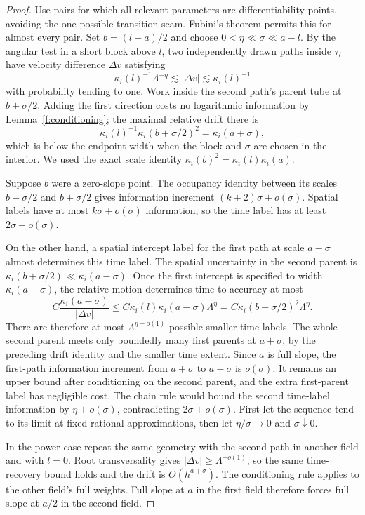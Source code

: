 \begin{proof}
Use pairs for which all relevant parameters are differentiability
points, avoiding the one possible transition seam. Fubini's theorem
permits this for almost every pair. Set $b=(l+a)/2$ and choose
$0<\eta\ll\sigma\ll a-l$. By the angular test in a short block
above $l$, two independently drawn paths inside $\tau_l$ have
velocity difference $\Delta v$ satisfying
\[
 \kappa_i(l)^{-1}\Lambda^{-\eta}
 \lesssim|\Delta v|\lesssim\kappa_i(l)^{-1}
\]
with probability tending to one. Work inside the second path's
parent tube at $b+\sigma/2$. Adding the first direction costs no
logarithmic information by Lemma~\ref{f:conditioning}; the maximal
relative drift there is
\[
 \kappa_i(l)^{-1}\kappa_i(b+\sigma/2)^2
       =\kappa_i(a+\sigma),
\]
which is below the endpoint width when the block and $\sigma$ are
chosen in the interior. We used the exact scale identity
$\kappa_i(b)^2=\kappa_i(l)\kappa_i(a)$.

Suppose $b$ were a zero-slope point. The occupancy identity between
its scales $b-\sigma/2$ and $b+\sigma/2$ gives information
increment $(k+2)\sigma+o(\sigma)$. Spatial labels have at most
$k\sigma+o(\sigma)$ information, so the time label has at least
$2\sigma+o(\sigma)$.

On the other hand, a spatial intercept label for the first path
at scale $a-\sigma$ almost determines this time label. The spatial
uncertainty in the second parent is
$\kappa_i(b+\sigma/2)\ll\kappa_i(a-\sigma)$. Once the first
intercept is specified to width $\kappa_i(a-\sigma)$, the relative
motion determines time to accuracy at most
\[
 C\frac{\kappa_i(a-\sigma)}{|\Delta v|}
 \le C\kappa_i(l)\kappa_i(a-\sigma)\Lambda^\eta
 =C\kappa_i(b-\sigma/2)^2\Lambda^\eta.
\]
There are therefore at most $\Lambda^{\eta+o(1)}$ possible smaller
time labels. The whole second parent meets only boundedly many
first parents at $a+\sigma$, by the preceding drift identity and
the smaller time extent. Since $a$ is full slope, the first-path
information increment from $a+\sigma$ to $a-\sigma$ is
$o(\sigma)$. It remains an upper bound after conditioning on the
second parent, and the extra first-parent label has negligible
cost. The chain rule would bound the second time-label information
by $\eta+o(\sigma)$, contradicting $2\sigma+o(\sigma)$. First let
the sequence tend to its limit at fixed rational approximations,
then let $\eta/\sigma\to0$ and $\sigma\downarrow0$.

In the power case repeat the same geometry with the second path
in another field and with $l=0$. Root transversality gives
$|\Delta v|\ge\Lambda^{-o(1)}$, so the same time-recovery bound
holds and the drift is $O(h^{a+\sigma})$. The conditioning rule
applies to the other field's full weights. Full slope at $a$ in
the first field therefore forces full slope at $a/2$ in the
second field.


\end{proof}
